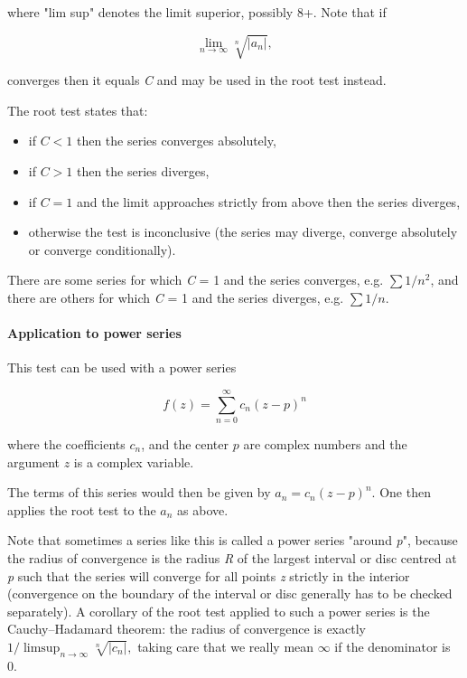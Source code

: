 where "lim sup" denotes the limit superior, possibly 8+. Note that if



$$\lim _{n\rightarrow\infty}\sqrt[n]{|a _n|},$$



converges then it equals \textit{C} and may be used in the root test instead.



The root test states that:



\begin{itemize}
    \item if $C < 1$ then the series converges absolutely,
    \item if $C > 1$ then the series diverges,
    \item if $C = 1$ and the limit approaches strictly from above then the series diverges,
    \item otherwise the test is inconclusive (the series may diverge, converge absolutely or converge conditionally).
\end{itemize}

There are some series for which \textit{C} = 1 and the series converges, e.g. $\textstyle \sum 1/{n^2}$, and there are others for which \textit{C} = 1 and the series diverges, e.g. $\textstyle\sum 1/n$.



\paragraph{Application to power series}



This test can be used with a power series



$$f(z) = \sum _{n=0}^\infty c _n (z-p)^n$$



where the coefficients $c _n$, and the center $p$ are complex numbers and the argument $z$ is a complex variable.



The terms of this series would then be given by $a _n = c _n (z - p) ^n$. One then applies the root test to the $a _n$ as above.



Note that sometimes a series like this is called a power series "around \textit{p}", because the radius of convergence is the radius \textit{R} of the largest interval or disc centred at \textit{p} such that the series will converge for all points \textit{z} strictly in the interior (convergence on the boundary of the interval or disc generally has to be checked separately). A corollary of the root test applied to such a power series is the Cauchy--Hadamard theorem: the radius of convergence is exactly $1/\limsup _{n \rightarrow \infty}{\sqrt[n]{|c _n|}},$ taking care that we really mean $\infty$ if the denominator is 0.



